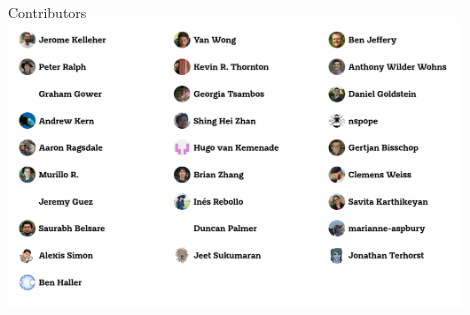 \documentclass[landscape,a0paper,fontscale=0.4]{baposter}
\begin{document}
\begin{poster}
\begin{posterbox}[name=refs,column=2,above=bottom]{Contributors}
    \includegraphics[width=0.9\textwidth]{tskit-contributors}


\end{posterbox}


\end{poster}%
\end{document}
